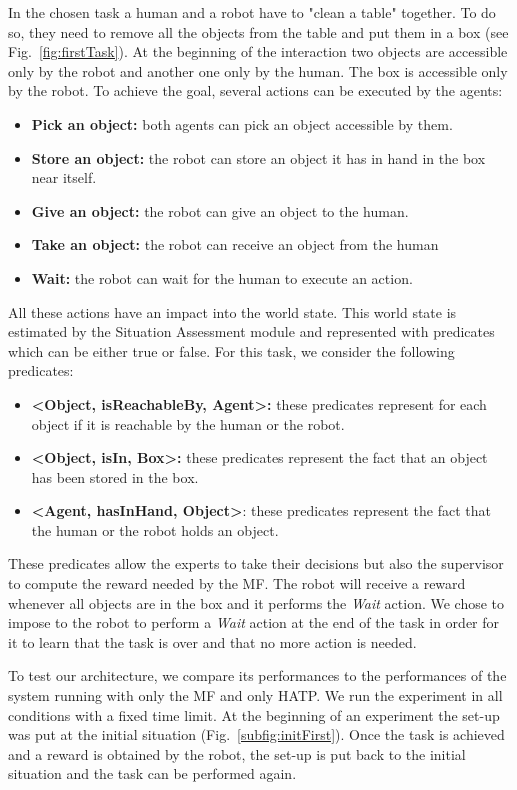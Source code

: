 \documentclass[english,a4paper,11pt,twoside]{StyleThese}
\begin{document}
In the chosen task a human and a robot have to "clean a table" together. To do so, they need to remove all the objects from the table and put them in a box (see Fig.~\ref{fig:firstTask}). At the beginning of the interaction two objects are accessible only by the robot and another one only by the human. The box is accessible only by the robot. To achieve the goal, several actions can be executed by the agents:
\begin{itemize}
\item \textbf{Pick an object:} both agents can pick an object accessible by them.
\item \textbf{Store an object:} the robot can store an object it has in hand in the box near itself. 
\item \textbf{Give an object:} the robot can give an object to the human.
\item \textbf{Take an object:} the robot can receive an object from the human
\item \textbf{Wait:} the robot can wait for the human to execute an action.
\end{itemize}
All these actions have an impact into the world state. This world state is estimated by the Situation Assessment module and represented with predicates which can be either true or false. For this task, we consider the following predicates:
\begin{itemize}
\item \textbf{<Object, isReachableBy, Agent>:} these predicates represent for each object if it is reachable by the human or the robot.
\item \textbf{<Object, isIn, Box>:} these predicates represent the fact that an object has been stored in the box.
\item \textbf{<Agent, hasInHand, Object>}: these predicates represent the fact that the human or the robot holds an object.
\end{itemize}
These predicates allow the experts to take their decisions but also the supervisor to compute the reward needed by the MF. The robot will receive a reward whenever all objects are in the box and it performs the \textit{Wait} action. We chose to impose to the robot to perform a \textit{Wait} action at the end of the task in order for it to learn that the task is over and that no more action is needed.

To test our architecture, we compare its performances to the performances of the system running with only the MF and only HATP. We run the experiment in all conditions with a fixed time limit. At the beginning of an experiment the set-up was put at the initial situation (Fig.~\ref{subfig:initFirst}). Once the task is achieved and a reward is obtained by the robot, the set-up is put back to the initial situation and the task can be performed again.
\end{document}
